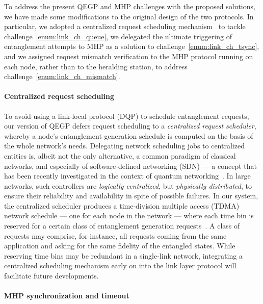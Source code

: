To address the present QEGP and MHP challenges with the proposed solutions, we have made some
modifications to the original design of the two protocols. In particular, we adopted a centralized
request scheduling mechanism~\cite{skrzypczyk_2021_arch} to tackle
challenge~\ref{enum:link_ch_queue}, we delegated the ultimate triggering of entanglement attempts to
MHP as a solution to challenge~\ref{enum:link_ch_tsync}, and we assigned request mismatch
verification to the MHP protocol running on each node, rather than to the heralding station, to
address challenge~\ref{enum:link_ch_mismatch}.

\paragraph{Centralized request scheduling}

To avoid using a link-local protocol (DQP) to schedule entanglement requests, our version of QEGP
defers request scheduling to a \emph{centralized request scheduler}, whereby a node's entanglement
generation schedule is computed on the basis of the whole network's needs. Delegating network
scheduling jobs to centralized entities is, albeit not the only alternative, a common paradigm of
classical networks, and especially of software-defined networking (SDN) --- a concept that has been
recently investigated in the context of quantum networking~\cite{aguado_2020_enabling,
kozlowski_2020_p4}. In large networks, such controllers are \emph{logically centralized}, but
\emph{physically distributed}, to ensure their reliability and availability in spite of possible
failures. In our system, the centralized scheduler produces a time-division multiple access (TDMA)
network schedule --- one for each node in the network --- where each time bin is reserved for a
certain class of entanglement generation requests~\cite{skrzypczyk_2021_arch}. A class of requests
may comprise, for instance, all requests coming from the same application and asking for the same
fidelity of the entangled states. While reserving time bins may be redundant in a single-link
network, integrating a centralized scheduling mechanism early on into the link layer protocol will
facilitate future developments.

\paragraph{MHP synchronization and timeout}

